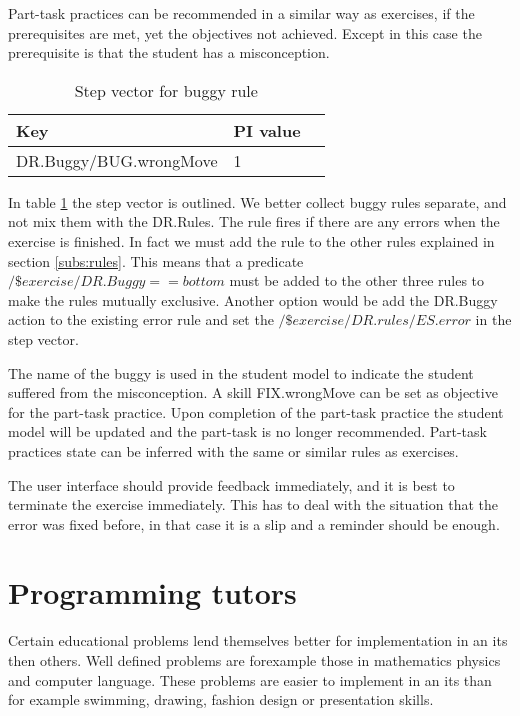 Part-task practices can be recommended in a similar way as exercises, if the prerequisites are met, yet the objectives not achieved.
Except in this case the prerequisite is that the student has a misconception.


\begin{table}[H]
\begin{tabular}{| l | l | l |}
\hline
Key & PI value\\
\hline
DR.Buggy/BUG.wrongMove & 1\\
\hline
\end{tabular}
\caption{Step vector for buggy rule}
\label{buggy.step}
\end{table}


In table \ref{buggy.step} the step vector is outlined. 
We better collect buggy rules separate, and not mix them with the DR.Rules.
The rule fires if there are any errors when the exercise is finished.
In fact  we must add the rule to the other rules explained in section \ref{subs:rules}.
This means that a predicate $\mathit{ /\$exercise/DR.Buggy == bottom}$ must be added to the other three rules to make the rules mutually exclusive.
Another option would be add the DR.Buggy action to the existing error rule and set the $\mathit{/\$exercise/DR.rules/ES.error}$ in the step vector.

The name of the buggy is used in the student model to indicate the student suffered from the misconception.
A skill FIX.wrongMove can be set as objective for the part-task practice.
Upon completion of the part-task practice the student model will be updated and the part-task is no longer recommended.
Part-task practices state can be inferred  with the same or similar rules as exercises.

The user interface should provide feedback immediately, and it is best to terminate the exercise immediately.
This has to deal with the situation that the error was fixed before, in that case it is a slip and a reminder should be enough.


\section{Programming tutors}
\label{progtut}

Certain educational problems lend themselves better for implementation in an \gls{its} then others.
Well defined problems are forexample  those in mathematics physics and computer language.
These problems are easier to implement in an \gls{its} than for example swimming, drawing, fashion design or presentation skills.




